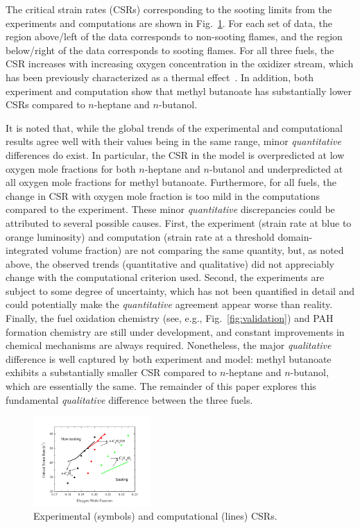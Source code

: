 \documentclass[review,3p,times]{elsarticleUS}
\begin{document}
The critical strain rates (CSRs) corresponding to the sooting limits from the experiments and computations are shown in Fig.~\ref{fig:Exp-Comp}. For each set of data, the region above/left of the data corresponds to non-sooting flames, and the region below/right of the data corresponds to sooting flames. For all three fuels, the CSR increases with increasing oxygen concentration in the oxidizer stream, which has been previously characterized as a thermal effect~\cite{du91}. In addition, both experiment and computation show that methyl butanoate has substantially lower CSRs compared to  $n$-heptane and $n$-butanol. 

It is noted that, while the global trends of the experimental and computational results agree well with their values being in the same range, minor \emph{quantitative} differences do exist. In particular, the CSR in the model is overpredicted at low oxygen mole fractions for both $n$-heptane and $n$-butanol and underpredicted at all oxygen mole fractions for methyl butanoate.  Furthermore, for all fuels, the change in CSR with oxygen mole fraction is too mild in the computations compared to the experiment.  These minor \emph{quantitative} discrepancies could be attributed to several possible causes.  First, the experiment (strain rate at blue to orange luminosity) and computation (strain rate at a threshold domain-integrated volume fraction) are not comparing the same quantity, but, as noted above, the observed trends (quantitative and qualitative) did not appreciably change with the computational criterion used.  Second, the experiments are subject to some degree of uncertainty, which has not been quantified in detail and could potentially make the \emph{quantitative} agreement appear worse than reality. Finally, the fuel oxidation chemistry (see, e.g., Fig.~\ref{fig:validation}) and PAH formation chemistry are still under development, and constant improvements in chemical mechanisms are always required.  Nonetheless, the major \emph{qualitative} difference is well captured by both experiment and model: methyl butanoate exhibits a substantially smaller CSR compared to $n$-heptane and $n$-butanol, which are essentially the same.  The remainder of this paper explores this fundamental \emph{qualitative} difference between the three fuels. 


\begin{figure}[ht]
  \centering
  \scriptsize
  \vspace{-0.1in}
  \includegraphics[trim=4mm 8mm 30mm 20mm, clip=true, width=0.4\textwidth]{Exp-Comp.png}
  \normalsize
  \vspace{-0.1in}
  \caption{Experimental (symbols) and computational (lines) CSRs.}
  \label{fig:Exp-Comp}
\end{figure}
\end{document}
